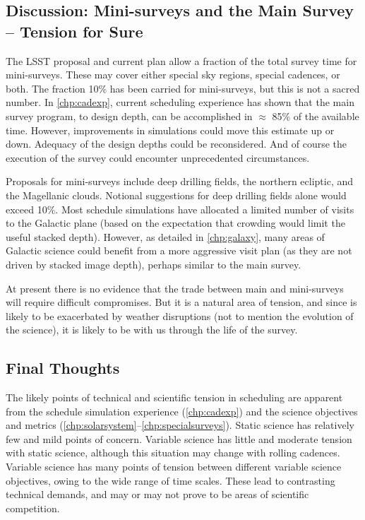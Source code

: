 
\subsection{Discussion: Mini-surveys and the Main Survey -- Tension for Sure}

The LSST proposal and current plan allow a fraction of the total survey
time for mini-surveys. These may cover either special sky regions,
special cadences, or both. The fraction 10\% has been carried for
mini-surveys, but this is not a sacred number. In
\autoref{chp:cadexp}, current scheduling experience has shown that the
main survey program, to design depth, can be accomplished in $\approx$
85\% of the available time. However, improvements in simulations could
move this estimate up or down. Adequacy of the design depths could be
reconsidered.  And of course the execution of the survey could encounter
unprecedented circumstances.

Proposals for mini-surveys include deep drilling fields, the northern
ecliptic, and the Magellanic clouds. Notional suggestions for deep
drilling fields alone would exceed 10\%.   Most schedule simulations
have allocated a limited number of visits to the Galactic plane (based
on the expectation that crowding would limit the useful stacked depth).
However, as detailed in \autoref{chp:galaxy}, many areas of Galactic
science could benefit from a more aggressive visit plan (as they are not driven by stacked image depth), perhaps similar
to the main survey.

At present there is no evidence that the trade between main and
mini-surveys will require difficult compromises.  But it is a natural
area of tension, and since is likely to be exacerbated by weather disruptions (not to
mention the evolution of the science), it is likely to be with us through
the life of the survey.


\subsection{Final Thoughts}

The likely points of technical and scientific tension in scheduling are
apparent from the schedule simulation experience (\autoref{chp:cadexp})
and the science objectives and metrics
(\autoref{chp:solarsystem}--\autoref{chp:specialsurveys}).  Static
science has relatively few and mild points of concern.  Variable science
has little and moderate tension with static science, although this situation may change with rolling cadences.  Variable science
has many points of tension between different variable science
objectives, owing to the wide range of time scales. These lead to
contrasting technical demands, and may or may not prove to be areas of
scientific competition.

